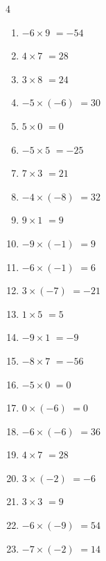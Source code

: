 \begin{multicols}{4}
\begin{enumerate}
  \item $-6\times 9$
        $=-54$

  \item $4\times 7$
        $=28$

  \item $3\times 8$
        $=24$

  \item $-5\times (-6)$
        $=30$

  \item $5\times 0$
        $=0$

  \item $-5\times 5$
        $=-25$

  \item $7\times 3$
        $=21$

  \item $-4\times (-8)$
        $=32$

  \item $9\times 1$
        $=9$

  \item $-9\times (-1)$
        $=9$

  \item $-6\times (-1)$
        $=6$

  \item $3\times (-7)$
        $=-21$

  \item $1\times 5$
        $=5$

  \item $-9\times 1$
        $=-9$

  \item $-8\times 7$
        $=-56$

  \item $-5\times 0$
        $=0$

  \item $0\times (-6)$
        $=0$

  \item $-6\times (-6)$
        $=36$

  \item $4\times 7$
        $=28$

  \item $3\times (-2)$
        $=-6$

  \item $3\times 3$
        $=9$

  \item $-6\times (-9)$
        $=54$

  \item $-7\times (-2)$
        $=14$


\end{enumerate}
\end{multicols}
